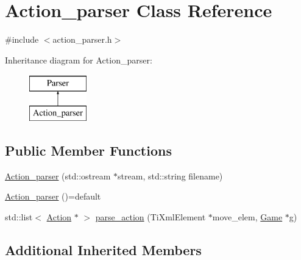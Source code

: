 \hypertarget{class_action__parser}{\section{Action\-\_\-parser Class Reference}
\label{class_action__parser}
}


{\ttfamily \#include $<$action\-\_\-parser.\-h$>$}

Inheritance diagram for Action\-\_\-parser\-:\begin{figure}[H]
\begin{center}
\leavevmode
\includegraphics[height=2.000000cm]{class_action__parser}
\end{center}
\end{figure}
\subsection*{Public Member Functions}
\begin{DoxyCompactItemize}
\item 
\hyperlink{class_action__parser_a3c55a5dc1dacc4679fd8cf805a13845d}{Action\-\_\-parser} (std\-::ostream $\ast$stream, std\-::string filename)
\item 
\hyperlink{class_action__parser_a7fa6713374665d4f749a6fd512a45c80}{Action\-\_\-parser} ()=default
\item 
std\-::list$<$ \hyperlink{class_action}{Action} $\ast$ $>$ \hyperlink{class_action__parser_ac7663555d2b2d60dd764304a23f7b164}{parse\-\_\-action} (Ti\-Xml\-Element $\ast$move\-\_\-elem, \hyperlink{class_game}{Game} $\ast$g)
\end{DoxyCompactItemize}
\subsection*{Additional Inherited Members}



